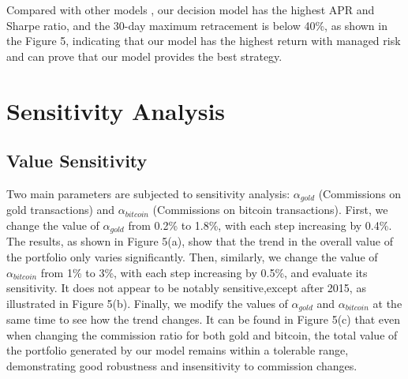 \documentclass{mcmthesis}
\begin{document}
Compared with other models , our decision model has the highest APR and Sharpe ratio, and the 30-day maximum retracement is below 40\%, as shown in the Figure 5, indicating that our model has the highest return with managed risk and can prove that our model provides the best strategy.


\newpage
\section{Sensitivity Analysis}
\subsection{Value Sensitivity}
Two main parameters are subjected to sensitivity analysis: $\alpha_{gold}$ (Commissions on gold transactions) and $\alpha_{bitcoin}$ (Commissions on bitcoin transactions). First, we change the value of $\alpha_{gold}$ from 0.2\% to 1.8\%, with each step increasing by 0.4\%. The results, as shown in Figure 5(a), show that the trend in the overall value of the portfolio only varies significantly. Then, similarly, we change the value of $\alpha_{bitcoin}$ from 1\% to 3\%, with each step increasing by 0.5\%, and evaluate its sensitivity. It does not appear to be notably sensitive,except after 2015, as illustrated in Figure 5(b). Finally, we modify the values of $\alpha_{gold}$ and $\alpha_{bitcoin}$ at the same time to see how the trend changes. It can be found in Figure 5(c) that even when changing the commission ratio for both gold and bitcoin, the total value of the portfolio generated by our model remains within a tolerable range, demonstrating good robustness and insensitivity to commission changes.
\end{document}
